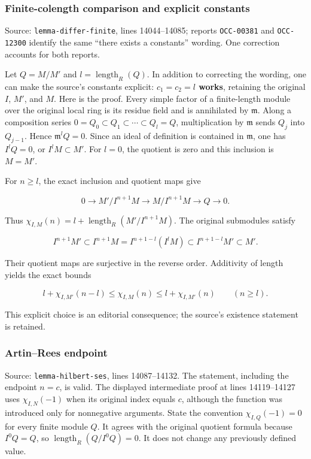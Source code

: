 \subsubsection{Finite-colength comparison and explicit constants}\label{algebra-proof-003-finite-colength-comparison-and-explicit-constants}

Source: \texttt{lemma-\AlgebraIdentifierBreak{}differ-\AlgebraIdentifierBreak{}finite}, lines 14044--14085; reports \texttt{OCC-00381} and \texttt{OCC-12300} identify the same ``there exists a constants'' wording. One correction accounts for both reports.

Let \(Q=M/M'\) and \(l=\operatorname{length}_R(Q)\). In addition to correcting the wording, one can make the source's constants explicit: \textbf{\(c_1=c_2=l\) works}, retaining the original \(I\), \(M'\), and \(M\). Here is the proof. Every simple factor of a finite-length module over the original local ring is its residue field and is annihilated by \(\mathfrak m\). Along a composition series \(0=Q_0\subset Q_1\subset\cdots\subset Q_l=Q\), multiplication by \(\mathfrak m\) sends \(Q_j\) into \(Q_{j-1}\). Hence \(\mathfrak m^lQ=0\). Since an ideal of definition is contained in \(\mathfrak m\), one has \(I^lQ=0\), or \(I^lM\subset M'\). For \(l=0\), the quotient is zero and this inclusion is \(M=M'\).

For \(n\geq l\), the exact inclusion and quotient maps give

\[
0\longrightarrow M'/I^{n+1}M\longrightarrow M/I^{n+1}M
\longrightarrow Q\longrightarrow0.
\]

Thus \(\chi_{I,M}(n)=l+\operatorname{length}_R(M'/I^{n+1}M)\). The original submodules satisfy

\[
I^{n+1}M'\subset I^{n+1}M
 =I^{n+1-l}(I^lM)\subset I^{n+1-l}M'\subset M'.
\]

Their quotient maps are surjective in the reverse order. Additivity of length yields the exact bounds

\[
l+\chi_{I,M'}(n-l)\leq\chi_{I,M}(n)
\leq l+\chi_{I,M'}(n)\qquad(n\geq l).
\]

This explicit choice is an editorial consequence; the source's existence statement is retained.

\subsubsection{Artin--Rees endpoint}\label{algebra-proof-003-artinrees-endpoint}

Source: \texttt{lemma-\AlgebraIdentifierBreak{}hilbert-\AlgebraIdentifierBreak{}ses}, lines 14087--14132. The statement, including the endpoint \(n=c\), is valid. The displayed intermediate proof at lines 14119--14127 uses \(\chi_{I,N}(-1)\) when its original index equals \(c\), although the function was introduced only for nonnegative arguments. State the convention \(\chi_{I,Q}(-1)=0\) for every finite module \(Q\). It agrees with the original quotient formula because \(I^0Q=Q\), so \(\operatorname{length}_R(Q/I^0Q)=0\). It does not change any previously defined value.

